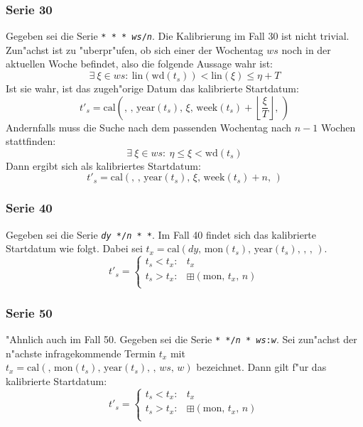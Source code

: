 \documentclass[a4paper]{article}
\newcommand*{\monf}{\mathrm{mon}}
\newcommand*{\yearf}{\mathrm{year}}
\newcommand*{\wdf}{\mathrm{wd}}
\newcommand*{\weekf}{\mathrm{week}}
\newcommand*{\linf}{\mathrm{lin}}
\newcommand*{\calf}{\mathrm{cal}}
\newcommand*{\addff}{\boxplus}
\numberwithin{equation}{section}
\begin{document}
\subsubsection{Serie 30}
Gegeben sei die Serie \texttt{* * * \textit{ws}/\textit{n}}. Die Kalibrierung im
Fall 30 ist nicht trivial. Zun"achst ist zu "uberpr"ufen, ob sich einer der
Wochentag $ws$ noch in der aktuellen Woche befindet, also die folgende Aussage
wahr ist:
\begin{equation}
  \exists\ \xi \in ws :\ \linf(\wdf(t_s)) < \linf(\xi) \le \eta + T
\end{equation}
Ist sie wahr, ist das zugeh"orige Datum das kalibrierte Startdatum:
\begin{equation}
  t'_s = \calf(,\,,\,\yearf(t_s),\,\xi,\,\weekf(t_s) +
    \left\lfloor\frac{\xi}{T}\right\rfloor,\,)
\end{equation}
Andernfalls muss die Suche nach dem passenden Wochentag nach $n - 1$ Wochen
stattfinden:
\begin{equation}\exists\ \xi \in ws :\ \eta \le \xi < \wdf(t_s)\end{equation}
Dann ergibt sich als kalibriertes Startdatum:
\begin{equation}
  t'_s = \calf(,\,,\,\yearf(t_s),\,\xi,\,\weekf(t_s) + n,\,)
\end{equation}

\subsubsection{Serie 40}
Gegeben sei die Serie \texttt{\textit{dy} */\textit{n} * *}. Im Fall 40 findet
sich das kalibrierte Startdatum wie folgt. Dabei sei
$t_x = \calf(dy,\,\monf(t_s),\,\yearf(t_s),\,,\,,\,)$.
\begin{equation}
  t'_s = \left\{\begin{array}{ll}
      t_s < t_x: & t_x \\
      t_s > t_x: & \addff(\monf,\,t_x,\,n) \\
    \end{array}\right.
\end{equation}

\subsubsection{Serie 50}
"Ahnlich auch im Fall 50. Gegeben sei die Serie
\texttt{* */\textit{n} * \textit{ws}:\textit{w}}. Sei zun"achst der n"achste
infragekommende Termin $t_x$ mit
$t_x = \calf(,\,\monf(t_s),\,\yearf(t_s),\,,\,ws,\,w)$ bezeichnet. Dann gilt
f"ur das kalibrierte Startdatum:
\begin{equation}
  t'_s = \left\{\begin{array}{ll}
      t_s < t_x : & t_x \\
      t_s > t_x : & \addff(\monf,\,t_x,\,n) \\
    \end{array}\right.
\end{equation}
\end{document}
